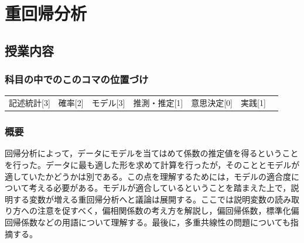 \section{重回帰分析}
\label{D1_lesson10}

\subsection{授業内容}
\subsubsection{科目の中でのこのコマの位置づけ}
\begin{tabular}[t]{ccccccc}
    記述統計[3] & 確率[2] & モデル[3] & 推測・推定[1] & 意思決定[0] & 実践[1]
\end{tabular}

\subsubsection{概要}
回帰分析によって，データにモデルを当てはめて係数の推定値を得るということを行った。データに最も適した形を求めて計算を行ったが，そのこととモデルが適していたかどうかは別である。この点を理解するためには，モデルの適合度について考える必要がある。モデルが適合しているということを踏まえた上で，説明する変数が増える重回帰分析へと議論は展開する。ここでは説明変数の読み取り方への注意を促すべく，偏相関係数の考え方を解説し，偏回帰係数，標準化偏回帰係数などの用語について理解する。最後に，多重共線性の問題についても指摘する。
